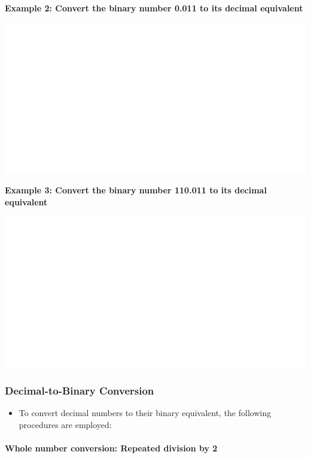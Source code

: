 \documentclass[]{book}
\providecommand{\tightlist}{%
  \setlength{\itemsep}{0pt}\setlength{\parskip}{0pt}}
\let\oldparagraph\paragraph
\renewcommand{\paragraph}[1]{\oldparagraph{#1}\mbox{}}
\begin{document}
\textbf{Example 2: Convert the binary number 0.011 to its decimal equivalent}

\begin{center}\includegraphics[width=1\linewidth]{figure/NSbox3-1} \end{center}

\textbf{Example 3: Convert the binary number 110.011 to its decimal equivalent}

\begin{center}\includegraphics[width=1\linewidth]{figure/NSbox4-1} \end{center}

\hypertarget{decimal-to-binary-conversion}{%
\subsubsection{Decimal-to-Binary Conversion}\label{decimal-to-binary-conversion}}

\begin{itemize}
\tightlist
\item
  To convert decimal numbers to their binary equivalent, the following procedures are employed:
\end{itemize}

\hypertarget{whole-number-conversion-repeated-division-by-2}{%
\paragraph{Whole number conversion: Repeated division by 2}\label{whole-number-conversion-repeated-division-by-2}}
\end{document}
